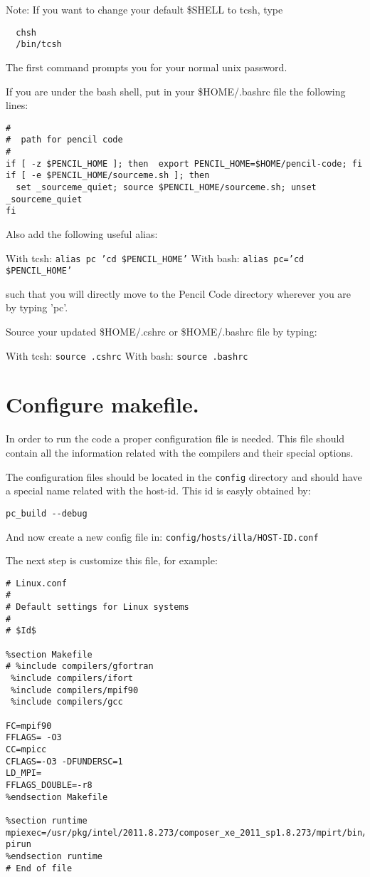 \documentclass[a4paper,12pt]{article}
\begin{document}
Note: If you want to change your default \$SHELL to tcsh, type

\begin{verbatim}
  chsh
  /bin/tcsh
\end{verbatim}

The first command prompts you for your normal unix password.

If you are under the bash shell, put in your \$HOME/.bashrc file the following
lines:
\begin{verbatim}
#
#  path for pencil code
#
if [ -z $PENCIL_HOME ]; then  export PENCIL_HOME=$HOME/pencil-code; fi
if [ -e $PENCIL_HOME/sourceme.sh ]; then
  set _sourceme_quiet; source $PENCIL_HOME/sourceme.sh; unset _sourceme_quiet
fi
\end{verbatim}

Also add the following useful alias:

With tcsh: \texttt{alias pc 'cd \$PENCIL\_HOME'}
With bash: \texttt{alias pc='cd \$PENCIL\_HOME'}

such that you will directly move to the Pencil Code directory wherever you are
by typing 'pc'.

Source your updated \$HOME/.cshrc or \$HOME/.bashrc file by typing:

With tcsh: \texttt{source .cshrc}
With bash: \texttt{source .bashrc}

\section{Configure makefile.}

In order to run the code a proper configuration file is needed. This file should contain all the information related with the compilers and their special options.

The configuration files should be located in the \verb|config| directory and should have a special name related with the host-id. This id is easyly obtained by:  
\begin{verbatim}
pc_build --debug
\end{verbatim}
And now create a new config file in:
\texttt{config/hosts/illa/HOST-ID.conf}

The next step is customize this file, for example:
\begin{verbatim}
# Linux.conf
#
# Default settings for Linux systems
#
# $Id$

%section Makefile
# %include compilers/gfortran
 %include compilers/ifort
 %include compilers/mpif90
 %include compilers/gcc

FC=mpif90 
FFLAGS= -O3  
CC=mpicc 
CFLAGS=-O3 -DFUNDERSC=1 
LD_MPI= 
FFLAGS_DOUBLE=-r8 
%endsection Makefile

%section runtime
mpiexec=/usr/pkg/intel/2011.8.273/composer_xe_2011_sp1.8.273/mpirt/bin/intel64/m
pirun
%endsection runtime
# End of file
\end{verbatim}
\end{document}
